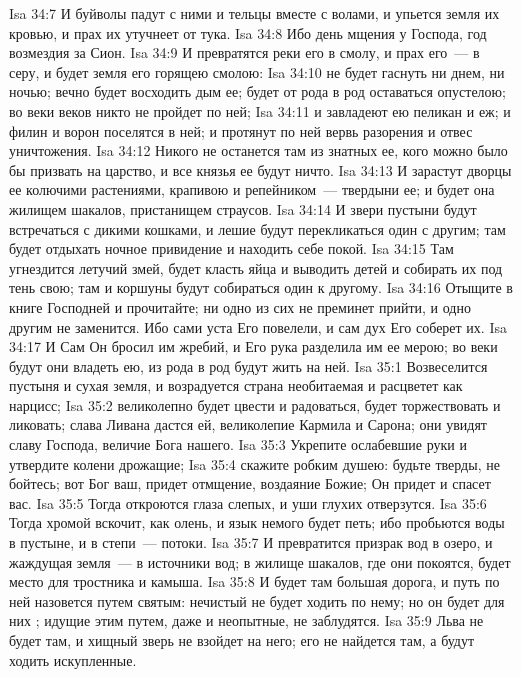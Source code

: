 \vs Isa 34:7 И буйволы падут с ними и тельцы вместе с волами, и упьется земля их кровью, и прах их утучнеет от тука.
\vs Isa 34:8 Ибо день мщения у Господа, год возмездия за Сион.
\vs Isa 34:9 И превратятся реки его в смолу, и прах его~--- в серу, и будет земля его горящею смолою:
\vs Isa 34:10 не будет гаснуть ни днем, ни ночью; вечно будет восходить дым ее; будет от рода в род оставаться опустелою; во веки веков никто не пройдет по ней;
\vs Isa 34:11 и завладеют ею пеликан и еж; и филин и ворон поселятся в ней; и протянут по ней вервь разорения и отвес уничтожения.
\vs Isa 34:12 Никого не останется там из знатных ее, кого можно было бы призвать на царство, и все князья ее будут ничто.
\vs Isa 34:13 И зарастут дворцы ее колючими растениями, крапивою и репейником~--- твердыни ее; и будет она жилищем шакалов, пристанищем страусов.
\vs Isa 34:14 И звери пустыни будут встречаться с дикими кошками, и лешие будут перекликаться один с другим; там будет отдыхать ночное привидение и находить себе покой.
\vs Isa 34:15 Там угнездится летучий змей, будет класть яйца и выводить детей и собирать их под тень свою; там и коршуны будут собираться один к другому.
\vs Isa 34:16 Отыщите в книге Господней и прочитайте; ни одно из сих не преминет прийти, и одно другим не заменится. Ибо сами уста Его повелели, и сам дух Его соберет их.
\vs Isa 34:17 И Сам Он бросил им жребий, и Его рука разделила им ее мерою; во веки будут они владеть ею, из рода в род будут жить на ней.
\vs Isa 35:1 Возвеселится пустыня и сухая земля, и возрадуется страна необитаемая и расцветет как нарцисс;
\vs Isa 35:2 великолепно будет цвести и радоваться, будет торжествовать и ликовать; слава Ливана дастся ей, великолепие Кармила и Сарона; они увидят славу Господа, величие Бога нашего.
\vs Isa 35:3 Укрепите ослабевшие руки и утвердите колени дрожащие;
\vs Isa 35:4 скажите робким душею: будьте тверды, не бойтесь; вот Бог ваш, придет отмщение, воздаяние Божие; Он придет и спасет вас.
\vs Isa 35:5 Тогда откроются глаза слепых, и уши глухих отверзутся.
\vs Isa 35:6 Тогда хромой вскочит, как олень, и язык немого будет петь; ибо пробьются воды в пустыне, и в степи~--- потоки.
\vs Isa 35:7 И превратится призрак вод в озеро, и жаждущая земля~--- в источники вод; в жилище шакалов, где они покоятся, будет место для тростника и камыша.
\vs Isa 35:8 И будет там большая дорога, и путь по ней назовется путем святым: нечистый не будет ходить по нему; но он будет для них ; идущие этим путем, даже и неопытные, не заблудятся.
\vs Isa 35:9 Льва не будет там, и хищный зверь не взойдет на него; его не найдется там, а будут ходить искупленные.
